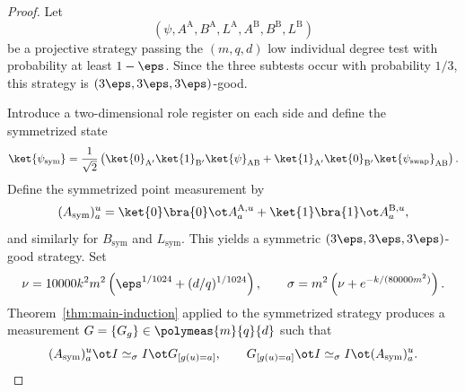 \begin{proof}
	\leanok
	Let
	\[
		(\psi,A^{\mathrm A},B^{\mathrm A},L^{\mathrm A},A^{\mathrm B},B^{\mathrm B},L^{\mathrm B})
	\]
	be a projective strategy passing the $(m,q,d)$ low individual degree test with probability at least $1-\eps$. Since the three subtests occur with probability $1/3$, this strategy is $(3\eps,3\eps,3\eps)$-good.

	Introduce a two-dimensional role register on each side and define the symmetrized state
	\[
		\ket{\psi_{\mathrm{sym}}}
		=
		\frac{1}{\sqrt{2}}
		\left(
		\ket{0}_{\mathrm{A}'}\ket{1}_{\mathrm{B}'}\ket{\psi}_{\mathrm{AB}}
		+
		\ket{1}_{\mathrm{A}'}\ket{0}_{\mathrm{B}'}\ket{\psi_{\mathrm{swap}}}_{\mathrm{AB}}
		\right).
	\]
	Define the symmetrized point measurement by
	\[
		(A_{\mathrm{sym}})_a^u
		=
		\ket{0}\bra{0} \ot A_a^{\mathrm A,u}
		+
		\ket{1}\bra{1} \ot A_a^{\mathrm B,u},
	\]
	and similarly for $B_{\mathrm{sym}}$ and $L_{\mathrm{sym}}$. This yields a symmetric $(3\eps,3\eps,3\eps)$-good strategy. Set
	\[
		\nu = 10000k^2m^2\left(\eps^{1/1024}+(d/q)^{1/1024}\right),
		\qquad
		\sigma = m^2\left(\nu+e^{-k/(80000m^2)}\right).
	\]
	Theorem~\ref{thm:main-induction} applied to the symmetrized strategy produces a measurement $G=\{G_g\} \in \polymeas{m}{q}{d}$ such that
	\begin{equation}\label{eq:symmetrized-induction-point-consistency}
		(A_{\mathrm{sym}})_a^u \ot I \simeq_\sigma I \ot G_{[g(u)=a]},
		\qquad
		G_{[g(u)=a]} \ot I \simeq_\sigma I \ot (A_{\mathrm{sym}})_a^u.
	\end{equation}


\end{proof}
